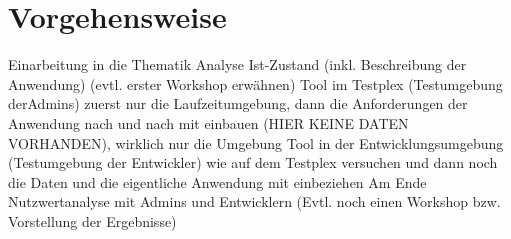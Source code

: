 \chapter{Vorgehensweise}\label{ch:vorgehensweise}

Einarbeitung in die Thematik
Analyse Ist-Zustand (inkl. Beschreibung der Anwendung)
(evtl. erster Workshop erwähnen)
Tool im Testplex (Testumgebung derAdmins) zuerst nur die Laufzeitumgebung, dann die Anforderungen der Anwendung nach und nach mit einbauen (HIER KEINE DATEN VORHANDEN), wirklich nur die Umgebung 
Tool in der Entwicklungsumgebung (Testumgebung der Entwickler) wie auf dem Testplex versuchen und dann noch die Daten und die eigentliche Anwendung mit einbeziehen
Am Ende Nutzwertanalyse mit Admins und Entwicklern
(Evtl. noch einen Workshop bzw. Vorstellung der Ergebnisse)
